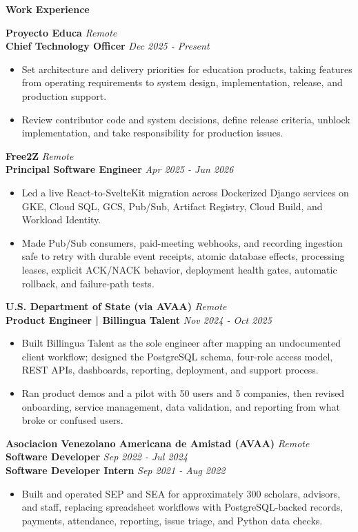 \documentclass[10pt]{article}
\newcommand{\sectiontitle}[1]{%
    \vspace{4pt}
    \begin{center}
        \textbf{#1}
    \end{center}
    \vspace{-5pt}
}
\begin{document}
\sectiontitle{Work Experience}
\textbf{Proyecto Educa} \hfill \textit{Remote} \\
\textbf{Chief Technology Officer} \hfill \textit{Dec 2025 - Present}
\begin{itemize}
    \item Set architecture and delivery priorities for education products, taking features from operating requirements to system design, implementation, release, and production support.
    \item Review contributor code and system decisions, define release criteria, unblock implementation, and take responsibility for production issues.
\end{itemize}

\vspace{2pt}
\textbf{Free2Z} \hfill \textit{Remote} \\
\textbf{Principal Software Engineer} \hfill \textit{Apr 2025 - Jun 2026}
\begin{itemize}
    \item Led a live React-to-SvelteKit migration across Dockerized Django services on GKE, Cloud SQL, GCS, Pub/Sub, Artifact Registry, Cloud Build, and Workload Identity.
    \item Made Pub/Sub consumers, paid-meeting webhooks, and recording ingestion safe to retry with durable event receipts, atomic database effects, processing leases, explicit ACK/NACK behavior, deployment health gates, automatic rollback, and failure-path tests.
\end{itemize}

\vspace{2pt}
\textbf{U.S. Department of State (via AVAA)} \hfill \textit{Remote} \\
\textbf{Product Engineer | Billingua Talent} \hfill \textit{Nov 2024 - Oct 2025}
\begin{itemize}
    \item Built Billingua Talent as the sole engineer after mapping an undocumented client workflow; designed the PostgreSQL schema, four-role access model, REST APIs, dashboards, reporting, deployment, and support process.
    \item Ran product demos and a pilot with 50 users and 5 companies, then revised onboarding, service management, data validation, and reporting from what broke or confused users.
\end{itemize}

\vspace{2pt}
\textbf{Asociacion Venezolano Americana de Amistad (AVAA)} \hfill \textit{Remote} \\
\textbf{Software Developer} \hfill \textit{Sep 2022 - Jul 2024} \\
\textbf{Software Developer Intern} \hfill \textit{Sep 2021 - Aug 2022}
\begin{itemize}
    \item Built and operated SEP and SEA for approximately 300 scholars, advisors, and staff, replacing spreadsheet workflows with PostgreSQL-backed records, payments, attendance, reporting, issue triage, and Python data checks.
\end{itemize}
\end{document}
